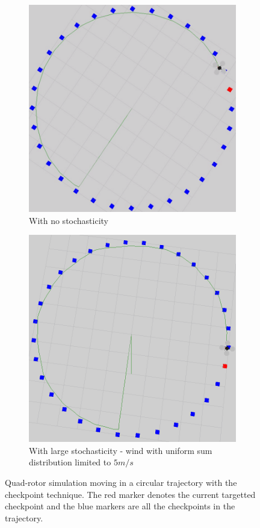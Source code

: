 \documentclass[hidelinks,BTech]{iitmdiss}
\begin{document}
\begin{figure}[H]
  \centering
  \begin{subfigure}[t]{0.45\textwidth}
    \centering
      \includegraphics[width=\textwidth]{checkpoint_circle.png}
      \caption{With no stochasticity}
  \end{subfigure}
  \begin{subfigure}[t]{0.45\textwidth}
    \centering
      \includegraphics[width=\textwidth]{checkpoint_circle_wind.png}
      \caption{With large stochasticity - wind with uniform sum distribution limited to $5 m/s$}
  \end{subfigure}
  \caption{Quad-rotor simulation moving in a circular trajectory with the checkpoint technique. The red marker denotes the current targetted checkpoint and the blue markers are all the checkpoints in the trajectory.}
\end{figure}
\end{document}
